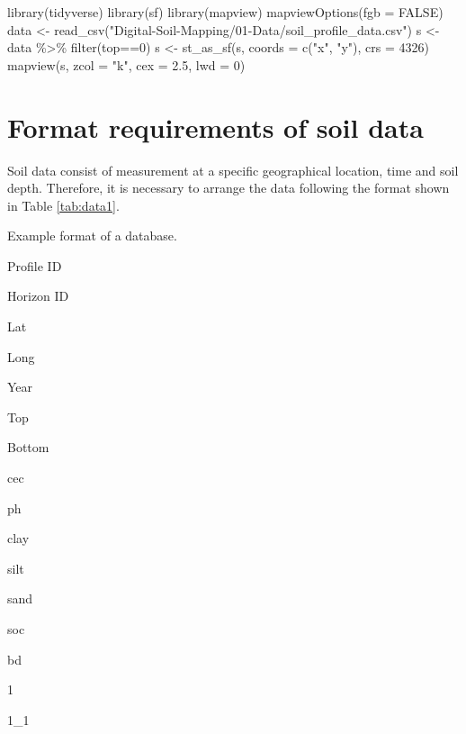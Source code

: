 \documentclass[
  10pt,
  b5paper,
  oneside]{book}
\newenvironment{Shaded}{\begin{snugshade}}{\end{snugshade}}
\newcommand{\AttributeTok}[1]{\textcolor[rgb]{0.77,0.63,0.00}{#1}}
\newcommand{\ConstantTok}[1]{\textcolor[rgb]{0.00,0.00,0.00}{#1}}
\newcommand{\DecValTok}[1]{\textcolor[rgb]{0.00,0.00,0.81}{#1}}
\newcommand{\FloatTok}[1]{\textcolor[rgb]{0.00,0.00,0.81}{#1}}
\newcommand{\FunctionTok}[1]{\textcolor[rgb]{0.00,0.00,0.00}{#1}}
\newcommand{\NormalTok}[1]{#1}
\newcommand{\OtherTok}[1]{\textcolor[rgb]{0.56,0.35,0.01}{#1}}
\newcommand{\SpecialCharTok}[1]{\textcolor[rgb]{0.00,0.00,0.00}{#1}}
\newcommand{\StringTok}[1]{\textcolor[rgb]{0.31,0.60,0.02}{#1}}
\begin{document}
\begin{Shaded}
\begin{Highlighting}[]
\FunctionTok{library}\NormalTok{(tidyverse)}
\FunctionTok{library}\NormalTok{(sf)}
\FunctionTok{library}\NormalTok{(mapview)}
\FunctionTok{mapviewOptions}\NormalTok{(}\AttributeTok{fgb =} \ConstantTok{FALSE}\NormalTok{)}
\NormalTok{data }\OtherTok{\textless{}{-}} \FunctionTok{read\_csv}\NormalTok{(}\StringTok{"Digital{-}Soil{-}Mapping/01{-}Data/soil\_profile\_data.csv"}\NormalTok{)}
\NormalTok{s }\OtherTok{\textless{}{-}}\NormalTok{ data }\SpecialCharTok{\%\textgreater{}\%} \FunctionTok{filter}\NormalTok{(top}\SpecialCharTok{==}\DecValTok{0}\NormalTok{)}
\NormalTok{s }\OtherTok{\textless{}{-}} \FunctionTok{st\_as\_sf}\NormalTok{(s, }\AttributeTok{coords =} \FunctionTok{c}\NormalTok{(}\StringTok{"x"}\NormalTok{, }\StringTok{"y"}\NormalTok{), }\AttributeTok{crs =} \DecValTok{4326}\NormalTok{)}
\FunctionTok{mapview}\NormalTok{(s, }\AttributeTok{zcol =} \StringTok{"k"}\NormalTok{, }\AttributeTok{cex =} \FloatTok{2.5}\NormalTok{, }\AttributeTok{lwd =} \DecValTok{0}\NormalTok{)}
\end{Highlighting}
\end{Shaded}

\hypertarget{preproc}{%
\section{Format requirements of soil data}\label{preproc}}

Soil data consist of measurement at a specific geographical location, time and soil depth. Therefore, it is necessary to arrange the data following the format shown in Table \ref{tab:data1}.

\label{tab:data1}Example format of a database.

Profile ID

Horizon ID

Lat

Long

Year

Top

Bottom

cec

ph

clay

silt

sand

soc

bd

1

1\_1
\end{document}
